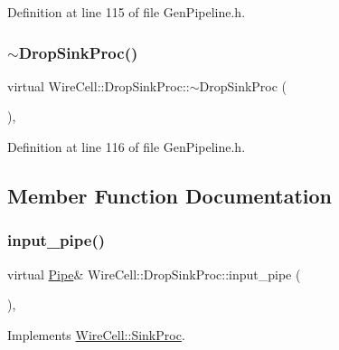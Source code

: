 Definition at line 115 of file Gen\+Pipeline.\+h.

\mbox{\label{class_wire_cell_1_1_drop_sink_proc_a160cdb8251d688487c88226b6a0209e9}} 
\subsubsection{\texorpdfstring{$\sim$\+Drop\+Sink\+Proc()}{~DropSinkProc()}}
{\footnotesize\ttfamily virtual Wire\+Cell\+::\+Drop\+Sink\+Proc\+::$\sim$\+Drop\+Sink\+Proc (\begin{DoxyParamCaption}{ }\end{DoxyParamCaption})\hspace{0.3cm}{\ttfamily [inline]}, {\ttfamily [virtual]}}



Definition at line 116 of file Gen\+Pipeline.\+h.



\subsection{Member Function Documentation}
\mbox{\label{class_wire_cell_1_1_drop_sink_proc_ab7cd47b06032c02f22e39a16d9a1aba6}} 
\subsubsection{\texorpdfstring{input\+\_\+pipe()}{input\_pipe()}}
{\footnotesize\ttfamily virtual \hyperlink{namespace_wire_cell_afce9bb01c731347c3d4c8ca9d4ed804f}{Pipe}\& Wire\+Cell\+::\+Drop\+Sink\+Proc\+::input\+\_\+pipe (\begin{DoxyParamCaption}{ }\end{DoxyParamCaption})\hspace{0.3cm}{\ttfamily [inline]}, {\ttfamily [virtual]}}



Implements \hyperlink{class_wire_cell_1_1_sink_proc_a47ec8c790457ad63e9d0bb9b1b7da935}{Wire\+Cell\+::\+Sink\+Proc}.



